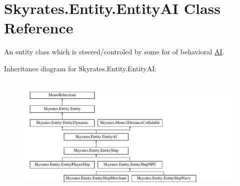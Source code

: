 \hypertarget{class_skyrates_1_1_entity_1_1_entity_a_i}{\section{Skyrates.\-Entity.\-Entity\-A\-I Class Reference}
\label{class_skyrates_1_1_entity_1_1_entity_a_i}
}


An entity class which is steered/controled by some for of behavioral \hyperlink{namespace_skyrates_1_1_a_i}{A\-I}.  


Inheritance diagram for Skyrates.\-Entity.\-Entity\-A\-I\-:\begin{figure}[H]
\begin{center}
\leavevmode
\includegraphics[height=5.993884cm]{class_skyrates_1_1_entity_1_1_entity_a_i}
\end{center}
\end{figure}
